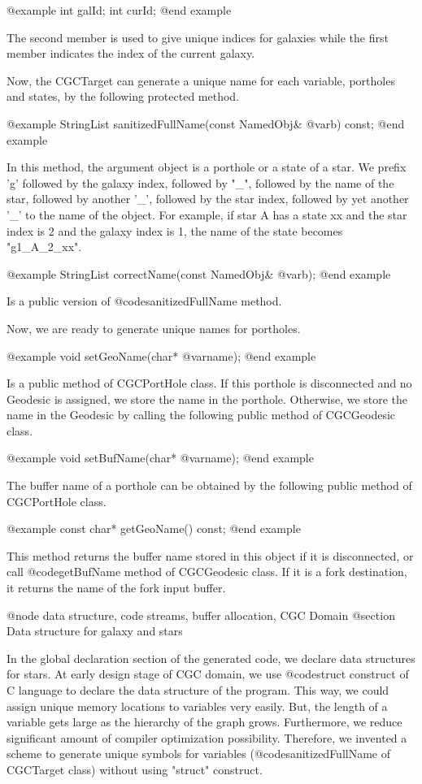 {@example
int galId;
int curId;
@end example

The second member is used to give unique indices for galaxies while the
first member indicates the index of the current galaxy.

Now, the CGCTarget can generate a unique name for each variable,
portholes and states, by the following protected method.

@example
StringList sanitizedFullName(const NamedObj& @var{b}) const;
@end example

In this method, the argument object is a porthole or a state of a star.
We prefix 'g' followed by the galaxy index, followed by "_", followed
by the name of the star, followed by another '_', followed by the star
index, followed by yet another '_' to the name of the object. For example,
if star A has a state xx and the star index is 2 and the galaxy index is 1,
the name of the state becomes "g1_A_2_xx".

@example
StringList correctName(const NamedObj& @var{b});
@end example

Is a public version of @code{sanitizedFullName} method.

Now, we are ready to generate unique names for portholes.

@example
void setGeoName(char* @var{name});
@end example

Is a public method of CGCPortHole class. If this porthole is disconnected
and no Geodesic is assigned, we store the name in the porthole. Otherwise,
we store the name in the Geodesic by calling the following public method
of CGCGeodesic class.

@example
void setBufName(char* @var{name});
@end example

The buffer name of a porthole can be obtained by the following public
method of CGCPortHole class.

@example
const char* getGeoName() const;
@end example

This method returns the buffer name stored in this object if it is
disconnected, or call @code{getBufName} method of CGCGeodesic class.
If it is a fork destination, it returns the name of the fork input buffer.

@node data structure, code streams, buffer allocation, CGC Domain
@section Data structure for galaxy and stars

In the global declaration section of the generated code, we declare
data structures for stars. At early design stage of CGC domain, we use
@code{struct} construct of C language to declare the data structure of
the program. This way, we could assign unique memory locations to variables
very easily. But, the length of a variable gets large as the hierarchy of
the graph grows. Furthermore, we reduce significant amount of
compiler optimization possibility. Therefore, we invented a scheme to generate
unique symbols for variables (@code{sanitizedFullName} of CGCTarget class)
without using "struct" construct.

}
